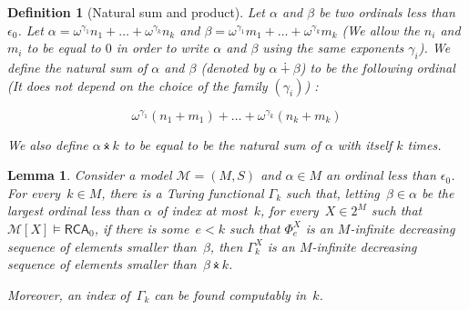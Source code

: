\documentclass{article}
\numberwithin{theorem}{section}
\newtheorem{lemma}[theorem]{Lemma}
\newtheorem{definition}[theorem]{Definition}
\newcommand{\RCA}{\mathsf{RCA}}
\newcommand{\M}{\mathcal{M}}
\newcommand{\nplus}{\dotplus}
\newcommand{\ntimes}{\dottimes}
\begin{document}
\begin{definition}[Natural sum and product]
Let $\alpha$ and $\beta$ be two ordinals less than $\epsilon_0$. Let $\alpha = \omega^{\gamma_1}n_1 + \dots + \omega^{\gamma_k}n_k$ and $\beta = \omega^{\gamma_1}m_1 + \dots + \omega^{\gamma_k}m_k$ (We allow the $n_i$ and $m_i$ to be equal to $0$ in order to write $\alpha$ and $\beta$ using the same exponents $\gamma_i$). We define the natural sum of $\alpha$ and $\beta$ (denoted by $\alpha \nplus \beta$) to be the following ordinal (It does not depend on the choice of the family $(\gamma_i)$) : 

$$\omega^{\gamma_1}(n_1 + m_1) + \dots + \omega^{\gamma_k}(n_k + m_k)$$

We also define $\alpha \ntimes k$ to be equal to be the natural sum of $\alpha$ with itself $k$ times. %
\end{definition}

\begin{lemma}\label{lem:shore-blocking-wf}
Consider a model $\M = (M,S)$ and $\alpha \in M$ an ordinal less than $\epsilon_0$.
For every~$k \in M$, there is a Turing functional $\Gamma_k$ such that, letting~$\beta \in \alpha$ be the largest ordinal less than $\alpha$ of index at most~$k$, for every~$X \in 2^M$ such that $\M[X] \models \RCA_0$, if there is some~$e < k$ such that $\Phi^X_e$ is an $M$-infinite decreasing sequence of elements smaller than~$\beta$, then $\Gamma^X_k$ is an $M$-infinite decreasing sequence of elements smaller than~$\beta \ntimes k$.

Moreover, an index of~$\Gamma_k$ can be found computably in~$k$.
\end{lemma}
\end{document}
